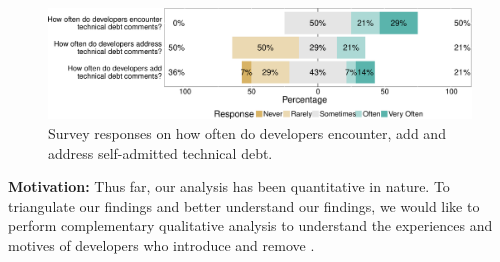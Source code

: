 





\begin{figure}[!tb]
	\centering
	\includegraphics[width=\columnwidth]{figures/test/responses_question.pdf}
	\caption{Survey responses on how often do developers encounter, add and address self-admitted technical debt.}
	\label{fig:encouner_add_address}
\end{figure}


 \noindent\rqiv

\noindent \textbf{Motivation:} 
Thus far, our analysis has been quantitative in nature. To triangulate our findings and better understand our findings, we would like to perform complementary qualitative analysis to understand the experiences and motives of developers who introduce and remove \SATD.



